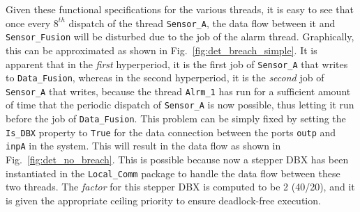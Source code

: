 Given these functional specifications for the various threads, it is
easy to see that once every $8^{th}$ dispatch of the thread
\texttt{Sensor\_A}, the data flow between it and
\texttt{Sensor\_Fusion} will be disturbed due to the job of the alarm
thread. Graphically, this can be approximated as shown in
Fig.~\ref{fig:det_breach_simple}. It is apparent that in the
\emph{first} hyperperiod, it is the first job of \texttt{Sensor\_A}
that writes to \texttt{Data\_Fusion}, whereas in the second
hyperperiod, it is the \emph{second} job of \texttt{Sensor\_A} that
writes, because the thread \texttt{Alrm\_1} has run for a sufficient
amount of time that the periodic dispatch of \texttt{Sensor\_A} is now
possible, thus letting it run before the job of
\texttt{Data\_Fusion}. This problem can be simply fixed by setting the
\texttt{Is\_DBX} property to \texttt{True} for the data connection
between the ports \texttt{outp} and \texttt{inpA} in the system. This
will result in the data flow as shown in
Fig.~\ref{fig:det_no_breach}. This is possible because now a stepper
DBX has been instantiated in the \texttt{Local\_Comm} package to
handle the data flow between these two threads. The \emph{factor} for
this stepper DBX is computed to be 2 (40/20), and it is given the
appropriate ceiling priority to ensure deadlock-free execution.

